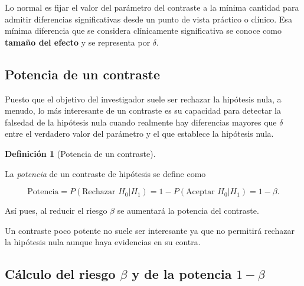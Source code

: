 \documentclass[
  spanish,
  a4paper,
]{scrreport}
\theoremstyle{plain}
\theoremstyle{definition}
\theoremstyle{definition}
\newtheorem{definition}{Definición}[chapter]
\theoremstyle{remark}
\begin{document}
Lo normal es fijar el valor del parámetro del contraste a la mínima
cantidad para admitir diferencias significativas desde un punto de vista
práctico o clínico. Esa mínima diferencia que se considera clínicamente
significativa se conoce como \textbf{tamaño del efecto} y se representa
por \(\delta\).

\subsection{Potencia de un contraste}\label{potencia-de-un-contraste}

Puesto que el objetivo del investigador suele ser rechazar la hipótesis
nula, a menudo, lo más interesante de un contraste es su capacidad para
detectar la falsedad de la hipótesis nula cuando realmente hay
diferencias mayores que \(\delta\) entre el verdadero valor del
parámetro y el que establece la hipótesis nula.

\begin{definition}[Potencia de un
contraste]\protect\hypertarget{def-potencia-contraste}{}\label{def-potencia-contraste}

La \emph{potencia} de un contraste de hipótesis se define como

\[
\mbox{Potencia} = P(\mbox{Rechazar }H_0|H_1) = 1 - P(\mbox{Aceptar }H_0|H_1) = 1-\beta.
\]

\end{definition}

Así pues, al reducir el riesgo \(\beta\) se aumentará la potencia del
contraste.

Un contraste poco potente no suele ser interesante ya que no permitirá
rechazar la hipótesis nula aunque haya evidencias en su contra.

\subsection{\texorpdfstring{Cálculo del riesgo \(\beta\) y de la
potencia
\(1-\beta\)}{Cálculo del riesgo \textbackslash beta y de la potencia 1-\textbackslash beta}}\label{cuxe1lculo-del-riesgo-beta-y-de-la-potencia-1-beta}
\end{document}
